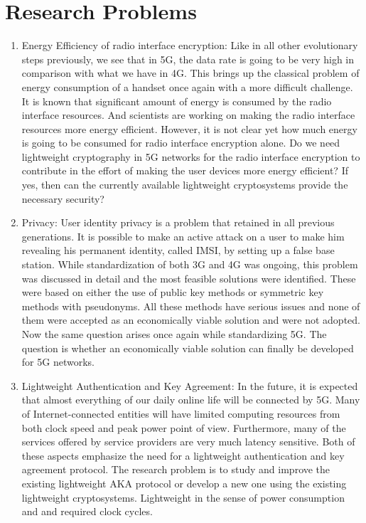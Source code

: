 \documentclass[14pt]{article}
\begin{document}
\section*{Research Problems} 
\begin{enumerate}
\item Energy Efficiency of radio interface encryption:\newline
Like in all other evolutionary steps previously, we see that in 5G, the data rate is going to be very high in comparison with what we have in 4G. This brings up the classical problem of energy consumption of a handset once again with a more difficult challenge. It is known that significant amount of energy is consumed by the radio interface resources. And scientists are working on making the radio interface resources more energy efficient. However, it is not clear yet how much energy is going to be consumed for radio interface encryption alone. Do we need lightweight cryptography in 5G networks for the radio interface encryption to contribute in the effort of making the user devices more energy efficient? If yes, then can the currently available lightweight cryptosystems provide the necessary security?

\item Privacy: \newline
User identity privacy is a problem that retained in all previous generations. It is possible to make an active attack on a user to make him revealing his permanent identity, called IMSI, by setting up a false base station. While standardization of both 3G and 4G was ongoing, this problem was discussed in detail and the most feasible solutions were identified. These were based on either the use of public key methods or symmetric key methods with pseudonyms. All these methods have serious issues and none of them were accepted as an economically viable solution and were not adopted. Now the same question arises once again while standardizing 5G. The question is whether an economically viable solution can finally be developed for 5G networks.

\item Lightweight Authentication and Key Agreement: \newline In the future, it is expected that almost everything of our daily online life will be connected by 5G. Many of Internet-connected entities will have limited computing resources from both clock speed and peak power point of view. Furthermore, many of the services offered by service providers are very much latency sensitive. Both of these aspects emphasize the need for a lightweight authentication and key agreement protocol. The research problem is to study and improve the existing lightweight AKA protocol or develop a new one using the existing lightweight cryptosystems. Lightweight in the sense of power consumption and and required clock cycles.


\end{enumerate}
\end{document}

